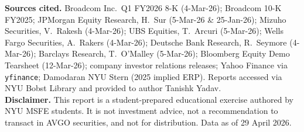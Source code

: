 \documentclass[10pt,letterpaper]{article}
\begin{document}
\vfill
{\footnotesize\color{nyugrey}\textbf{Sources cited.} Broadcom Inc.\ Q1 FY2026 8-K (4-Mar-26); Broadcom 10-K FY2025; JPMorgan Equity Research, H.\ Sur (5-Mar-26 \& 25-Jan-26); Mizuho Securities, V.\ Rakesh (4-Mar-26); UBS Equities, T.\ Arcuri (5-Mar-26); Wells Fargo Securities, A.\ Rakers (4-Mar-26); Deutsche Bank Research, R.\ Seymore (4-Mar-26); Barclays Research, T.\ O'Malley (5-Mar-26); Bloomberg Equity Demo Tearsheet (12-Mar-26); company investor relations releases; Yahoo Finance via \texttt{yfinance}; Damodaran NYU Stern (2025 implied ERP). Reports accessed via NYU Bobst Library and provided to author Tanishk Yadav.}\\[6pt]
{\footnotesize\color{accentred}\textbf{Disclaimer.} This report is a student-prepared educational exercise authored by NYU MSFE students. It is not investment advice, not a recommendation to transact in AVGO securities, and not for distribution. Data as of 29 April 2026.}
\end{document}

